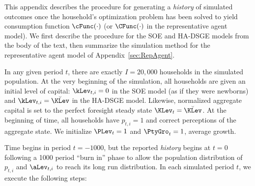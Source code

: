 
This appendix describes the procedure for generating a \textit{history}
of simulated outcomes once the household's optimization problem has
been solved to yield consumption function $\cFunc(\cdot)$ (or $\CFunc(\cdot)$
in the representative agent model).  We first describe the procedure for
the SOE and HA-DSGE models from the body of the text, then summarize
the simulation method for the representative agent model of Appendix~\ref{sec:RepAgent}.

In any given period $t$, there are exactly $I=20,000$ households in
the simulated population.  At the very beginning of the simulation, all households
are given an initial level of capital: $\kLev_{t,i} = 0$ in the SOE model (as if
they were newborns) and $\kLev_{t,i} = \breve{\KLev}$ in the HA-DSGE model.
Likewise, normalized aggregate capital is set to the perfect foresight
steady state $\KLev_t = \breve{\KLev}$.  At the beginning of time, all households
have $p_{t,i} = 1$ and correct perceptions of the aggregate state.
We initialize $\PLev_t=1$ and $\PtyGro_t=1$, average growth.

Time begins in period $t=-1000$, but the reported \textit{history}
begins at $t=0$ following a 1000 period ``burn in'' phase to allow the
population distribution of $p_{t,i}$ and $\aLev_{t,i}$ to reach its
long run distribution.  In each simulated period $t$, we execute the following steps:

